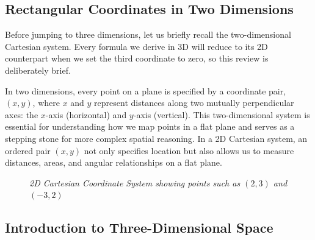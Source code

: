 \subsection*{Rectangular Coordinates in Two Dimensions} 

Before jumping to three dimensions, let us briefly recall the two-dimensional Cartesian system. Every formula we derive in 3D will reduce to its 2D counterpart when we set the third coordinate to zero, so this review is deliberately brief.

In two dimensions, every point on a plane is specified by a coordinate pair, \( (x, y) \), where \( x \) and \( y \) represent distances along two mutually perpendicular axes: the \( x \)-axis (horizontal) and \( y \)-axis (vertical). This two-dimensional system is essential for understanding how we map points in a flat plane and serves as a stepping stone for more complex spatial reasoning. In a 2D Cartesian system, an ordered pair \( (x, y) \) not only specifies location but also allows us to measure distances, areas, and angular relationships on a flat plane.

\begin{figure}[H]
    \centering
    \caption{\textit{2D Cartesian Coordinate System showing points such as \((2, 3)\) and \((-3, 2)\)}}
    \label{fig:2d_cartesian}
\end{figure}

\subsection*{Introduction to Three-Dimensional Space}


